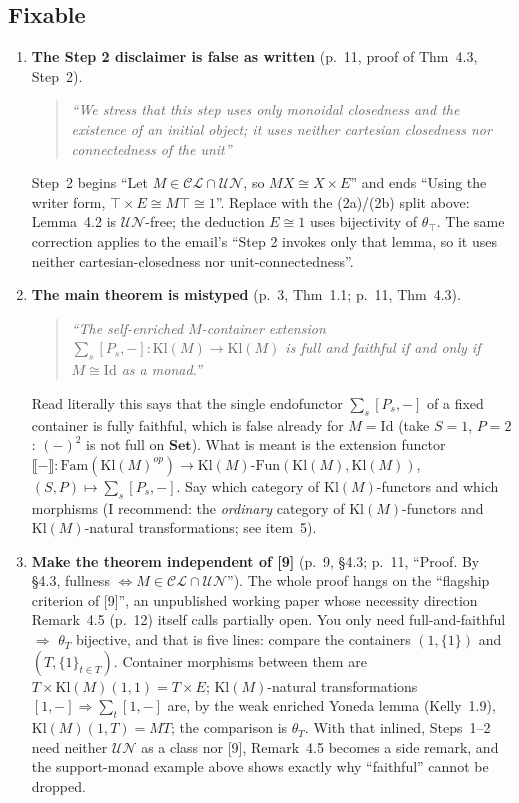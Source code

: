 \documentclass[11pt]{article}
\newcommand{\Kl}{\mathrm{Kl}}
\newcommand{\Set}{\mathbf{Set}}
\newcommand{\CL}{\mathcal{CL}}
\newcommand{\UN}{\mathcal{UN}}
\newcommand{\Fam}{\mathrm{Fam}}
\newenvironment{quoted}{\begin{quote}\small\itshape}{\end{quote}}
\begin{document}
\subsection*{Fixable}
\begin{enumerate}[leftmargin=*]
\item \textbf{The Step 2 disclaimer is false as written} (p.~11, proof of Thm~4.3, Step~2).
\begin{quoted}
``We stress that this step uses only monoidal closedness and the existence of an
initial object; it uses neither cartesian closedness nor connectedness of the
unit''
\end{quoted}
Step~2 begins ``Let $M\in\CL\cap\UN$, so $MX\cong X\times E$'' and ends ``Using the
writer form, $\top\times E\cong M\top\cong1$''. Replace with the (2a)/(2b) split above:
Lemma~4.2 is $\UN$-free; the deduction $E\cong1$ uses bijectivity of $\theta_\top$.
The same correction applies to the email's ``Step 2 invokes only that lemma, so it
uses neither cartesian-closedness nor unit-connectedness''.

\item \textbf{The main theorem is mistyped} (p.~3, Thm~1.1; p.~11, Thm~4.3).
\begin{quoted}
``The self-enriched $M$-container extension $\sum_s[P_s,-]:\Kl(M)\to\Kl(M)$ is full
and faithful if and only if $M\cong\mathrm{Id}$ as a monad.''
\end{quoted}
Read literally this says that the single endofunctor $\sum_s[P_s,-]$ of a fixed
container is fully faithful, which is false already for $M=\mathrm{Id}$ (take $S=1$,
$P=2$: $(-)^2$ is not full on $\Set$). What is meant is the extension functor
$\llbracket-\rrbracket:\Fam(\Kl(M)^{op})\to\Kl(M)\text{-}\mathrm{Fun}(\Kl(M),\Kl(M))$,
$(S,P)\mapsto\sum_s[P_s,-]$. Say which category of $\Kl(M)$-functors and which
morphisms (I recommend: the \emph{ordinary} category of $\Kl(M)$-functors and
$\Kl(M)$-natural transformations; see item~5).

\item \textbf{Make the theorem independent of [9]} (p.~9, \S4.3; p.~11, ``Proof. By
\S4.3, fullness $\iff M\in\CL\cap\UN$''). The whole proof hangs on the
``flagship criterion of [9]'', an unpublished working paper whose necessity
direction Remark~4.5 (p.~12) itself calls partially open. You only need
full-and-faithful $\Rightarrow$ $\theta_T$ bijective, and that is five lines:
compare the containers $(1,\{1\})$ and $(T,\{1\}_{t\in T})$. Container morphisms
between them are $T\times\Kl(M)(1,1)=T\times E$; $\Kl(M)$-natural transformations
$[1,-]\Rightarrow\sum_t[1,-]$ are, by the weak enriched Yoneda lemma (Kelly~1.9),
$\Kl(M)(1,T)=MT$; the comparison is $\theta_T$. With that inlined, Steps~1--2 need
neither $\UN$ as a class nor [9], Remark~4.5 becomes a side remark, and the
support-monad example above shows exactly why ``faithful'' cannot be dropped.


\end{enumerate}
\end{document}
